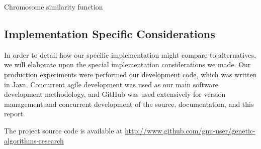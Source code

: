 \documentclass{sig-alternate}
\begin{document}
\begin{algorithm}
  \SetAlgoLined
  \DontPrintSemicolon
  
\caption{Chromosome similarity function}
\label{alg:similarity}
\end{algorithm}

\subsection{Implementation Specific Considerations}
In order to detail how our specific implementation might compare to alternatives, we will elaborate upon the special implementation considerations we made. Our production experiments were performed our development code, which was written in Java. Concurrent agile development was used as our main software development methodology, and GitHub was used extensively for version management and concurrent development of the source, documentation, and this report. 

The project source code is available at \url{http://www.github.com/gnu-user/genetic-algorithms-research}
\end{document}
